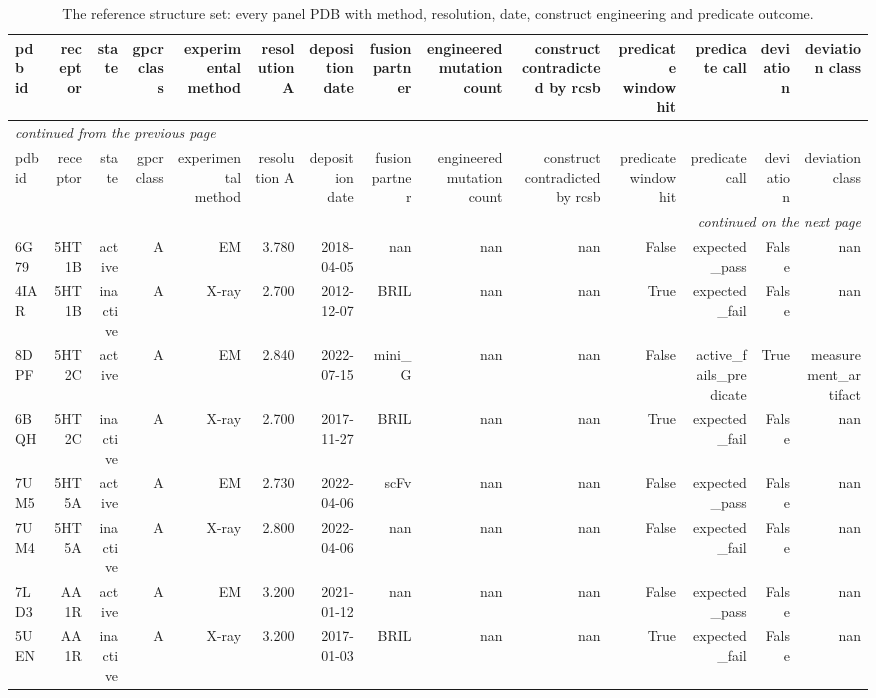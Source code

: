 \begingroup\footnotesize\setlength{\tabcolsep}{3pt}
\begin{longtable}{lrrrrrrrrrrrrr}
\caption{The reference structure set: every panel PDB with method, resolution, date, construct engineering and predicate outcome.}
\label{tab:s_t1_reference_set}\\
\toprule
pdb id & receptor & state & gpcr class & experimental method & resolution A & deposition date & fusion partner & engineered mutation count & construct contradicted by rcsb & predicate window hit & predicate call & deviation & deviation class \\
\midrule
\endfirsthead
\multicolumn{14}{l}{\scriptsize\itshape continued from the previous page}\\
\toprule
pdb id & receptor & state & gpcr class & experimental method & resolution A & deposition date & fusion partner & engineered mutation count & construct contradicted by rcsb & predicate window hit & predicate call & deviation & deviation class \\
\midrule
\endhead
\midrule
\multicolumn{14}{r}{\scriptsize\itshape continued on the next page}\\
\endfoot
\bottomrule
\endlastfoot
6G79 & 5HT1B & active & A & EM & 3.780 & 2018-04-05 & nan & nan & nan & False & expected\_pass & False & nan \\
4IAR & 5HT1B & inactive & A & X-ray & 2.700 & 2012-12-07 & BRIL & nan & nan & True & expected\_fail & False & nan \\
8DPF & 5HT2C & active & A & EM & 2.840 & 2022-07-15 & mini\_G & nan & nan & False & active\_fails\_predicate & True & measurement\_artifact \\
6BQH & 5HT2C & inactive & A & X-ray & 2.700 & 2017-11-27 & BRIL & nan & nan & True & expected\_fail & False & nan \\
7UM5 & 5HT5A & active & A & EM & 2.730 & 2022-04-06 & scFv & nan & nan & False & expected\_pass & False & nan \\
7UM4 & 5HT5A & inactive & A & X-ray & 2.800 & 2022-04-06 & nan & nan & nan & False & expected\_fail & False & nan \\
7LD3 & AA1R & active & A & EM & 3.200 & 2021-01-12 & nan & nan & nan & False & expected\_pass & False & nan \\
5UEN & AA1R & inactive & A & X-ray & 3.200 & 2017-01-03 & BRIL & nan & nan & True & expected\_fail & False & nan \\

\end{longtable}
